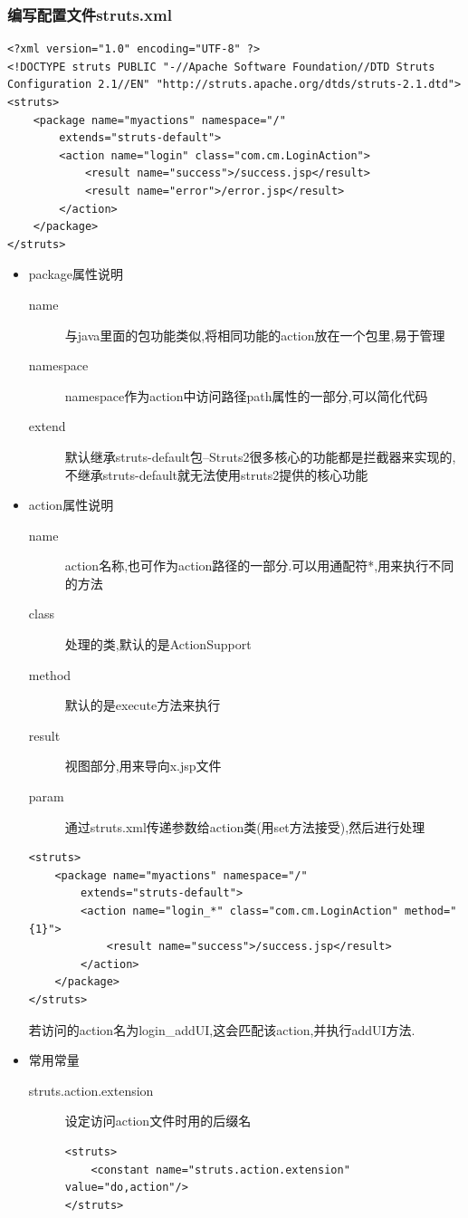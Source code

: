 \subsubsection{编写配置文件struts.xml}
\begin{lstlisting}[style=JAVA]
<?xml version="1.0" encoding="UTF-8" ?>
<!DOCTYPE struts PUBLIC "-//Apache Software Foundation//DTD Struts Configuration 2.1//EN" "http://struts.apache.org/dtds/struts-2.1.dtd">
<struts>
	<package name="myactions" namespace="/"
		extends="struts-default">
		<action name="login" class="com.cm.LoginAction">
			<result name="success">/success.jsp</result>
			<result name="error">/error.jsp</result>
		</action>
	</package>
</struts>    
\end{lstlisting}
\begin{itemize}
\item package属性说明
\begin{description}
\item[name]	与java里面的包功能类似,将相同功能的action放在一个包里,易于管理
\item[namespace]	namespace作为action中访问路径path属性的一部分,可以简化代码
\item[extend]	默认继承struts-default包--Struts2很多核心的功能都是拦截器来实现的,
不继承struts-default就无法使用struts2提供的核心功能
\end{description}


\item action属性说明
\begin{description}
\item[name]	action名称,也可作为action路径的一部分.可以用通配符*,用来执行不同的方法
\item[class]	处理的类,默认的是ActionSupport
\item[method]	默认的是execute方法来执行
\item[result]	视图部分,用来导向x.jsp文件
\item[param]		通过struts.xml传递参数给action类(用set方法接受),然后进行处理
\end{description}
\begin{lstlisting}[style=JAVA]
<struts>
	<package name="myactions" namespace="/"
		extends="struts-default">
		<action name="login_*" class="com.cm.LoginAction" method="{1}">
			<result name="success">/success.jsp</result>
		</action>
	</package>
</struts>    
\end{lstlisting}
若访问的action名为login\_{}addUI,这会匹配该action,并执行addUI方法.


\item 常用常量
\begin{description}
\item[struts.action.extension]	设定访问action文件时用的后缀名
\begin{lstlisting}[style=JAVA]
<struts>
	<constant name="struts.action.extension" value="do,action"/>
</struts>    
\end{lstlisting}


\end{description}
\end{itemize}
